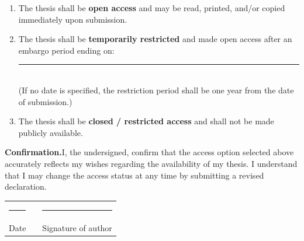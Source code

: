 \documentclass[12pt,a4paper]{article}
\newcommand{\checkbox}{$\square$\hspace{0.5em}}
\newcommand{\formrule}[1][6cm]{\rule{#1}{0.4pt}}
\begin{document}
\begin{enumerate}[label=\checkbox, leftmargin=2em, labelsep=0.3em, itemsep=0.9em]

    \item The thesis shall be \textbf{open access} and may be read,
          printed, and/or copied immediately upon submission.

    \item The thesis shall be \textbf{temporarily restricted} and made
          open access after an embargo period ending
          on:\enspace\formrule[5cm]\\[0.2em]
          {\small(If no date is specified, the restriction period
          shall be one year from the date of submission.)}

    \item The thesis shall be \textbf{closed / restricted access}
          and shall not be made publicly available.

\end{enumerate}

\vspace{1.2em}

\noindent
\textbf{Confirmation.}\enspace I, the undersigned, confirm that the
access option selected above accurately reflects my wishes regarding
the availability of my thesis. I understand that I may change the
access status at any time by submitting a revised declaration.

\vspace{2.8em}

\noindent
\begin{tabular}{@{}p{7.2cm} p{0.6cm} p{7.2cm}@{}}
    \formrule[7cm] & & \formrule[7cm] \\[0.3em]
    {\small Date} & & {\small Signature of author} \\
\end{tabular}
\end{document}
